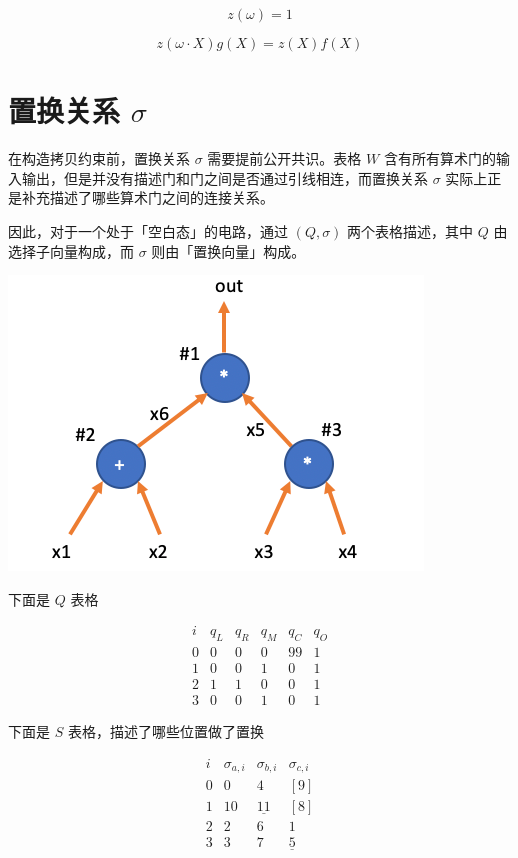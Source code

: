 \[
z(\omega) = 1
\]

\[
z(\omega\cdot X)g(X) = z(X)f(X) 
\]

\hypertarget{ux7f6eux6362ux5173ux7cfb-sigma}{%
\section{\texorpdfstring{置换关系
\(\sigma\)}{置换关系 \textbackslash sigma}}\label{ux7f6eux6362ux5173ux7cfb-sigma}}

在构造拷贝约束前，置换关系 \(\sigma\) 需要提前公开共识。表格 \(W\)
含有所有算术门的输入输出，但是并没有描述门和门之间是否通过引线相连，而置换关系
\(\sigma\) 实际上正是补充描述了哪些算术门之间的连接关系。

因此，对于一个处于「空白态」的电路，通过 \((Q, \sigma)\)
两个表格描述，其中 \(Q\) 由选择子向量构成，而 \(\sigma\)
则由「置换向量」构成。

\includegraphics{img/img20230414202348.png}

下面是 \(Q\) 表格

$$
\begin{array}{c|c|c|c|cc}
i & q_L & q_R & q_M & q_C & q_O \\
\hline 0 & 0 & 0 & 0 & 99 & 1 \\
1 & 0 & 0 & 1 & 0 & 1 \\
2 & 1 & 1 & 0 & 0 & 1 \\
3 & 0 & 0 & 1 & 0 & 1
\end{array}
$$

下面是 \(S\) 表格，描述了哪些位置做了置换

\[
\begin{array}{c|c|c|c|}
i & \sigma_{a,i} & \sigma_{b,i} & \sigma_{c,i}  \\
\hline
0 & 0 & 4 & [9] \\
1 & \boxed{10} & \underline{11} & [8] \\
2 & 2 & 6 & \boxed{1} \\
3 & 3 & 7 & \underline{5} \\
\end{array}
\]

